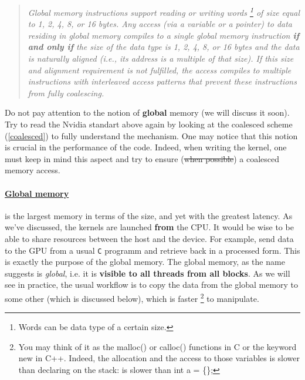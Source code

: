 \documentclass[12pt]{article}
\begin{document}
\vspace{-10pt}
\begin{quote}
   \textsl{Global memory instructions support reading or writing words \footnote{Words can be data type of a certain size.} 
   of size equal to 1, 2, 4, 8, or 16 bytes. 
   Any access (via a variable or a pointer) to data residing in global memory compiles to a single global memory 
   instruction \textbf{if and only if} the size of the data type is 1, 2, 4, 8, or 16 bytes and the data is naturally aligned 
   (i.e., its address is a multiple of that size). If this size and alignment requirement is not fulfilled, the access 
   compiles to multiple instructions with interleaved access patterns that prevent these instructions from fully coalescing.}
\label{coalescedquote}
\end{quote}
Do not pay attention to the notion of \textbf{global} memory (we will discuss it soon).
Try to read the Nvidia standart above again by looking at the coalesced scheme (\autoref{coalesced})
to fully understand the mechanism. One may notice that this notion is crucial in the performance of the code.
Indeed, when writing the kernel, one must keep in mind this aspect and try to ensure (\sout{when possible}) 
a coalesced memory access.

\vspace{-15pt}
\paragraph{\underline{Global memory}} is the largest memory in terms of the size, and yet with the greatest latency.
As we've discussed, the kernels are launched \textbf{from} the CPU. It would be wise to be able to share 
resources between the host and the device. For example, send data to the GPU from a usual \verb|C| programm
and retrieve back in a processed form. This is exactly the purpose of the global memory. The global memory, as the 
name suggests is \textsl{global}, i.e. it is \textbf{visible to all threads from all blocks}. As we will see in practice,
the usual workflow is to copy the data from the global memory to some other (which is discussed below), 
which is faster \footnote{You may think of it as the {\selectfont malloc()} or {\selectfont calloc()} functions in C
or the keyword {\selectfont new} in C++. Indeed, the allocation and the access to those variables is slower than 
declaring on the stack: is slower than {\selectfont int a = \{\};}}  
to manipulate. 
\end{document}
